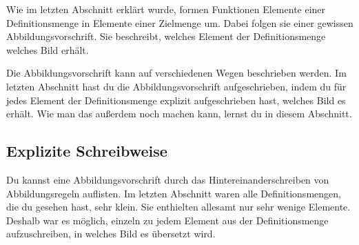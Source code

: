 \documentclass[../../main.tex]{subfiles}
\begin{document}
\label{sec:abbildungen_explizite_schreibweise}
Wie im letzten Abschnitt erklärt wurde, formen Funktionen Elemente einer Definitionsmenge in Elemente einer Zielmenge um. Dabei folgen sie einer gewissen Abbildungsvorschrift. Sie beschreibt, welches Element der Definitionsmenge welches Bild erhält.

Die Abbildungsvorschrift kann auf verschiedenen Wegen beschrieben werden. Im letzten Abschnitt hast du die Abbildungsvorschrift aufgeschrieben, indem du für jedes Element der Definitionsmenge explizit aufgeschrieben hast, welches Bild es erhält. Wie man das außerdem noch machen kann, lernst du in diesem Abschnitt.

\subsection{Explizite Schreibweise}

Du kannst eine Abbildungsvorschrift durch das Hintereinanderschreiben von Abbildungsregeln auflisten. Im letzten Abschnitt waren alle Definitionsmengen, die du gesehen hast, sehr klein. Sie enthielten allesamt nur sehr wenige Elemente. Deshalb war es möglich, einzeln zu jedem Element aus der Definitionsmenge aufzuschreiben, in welches Bild es übersetzt wird.
\end{document}
